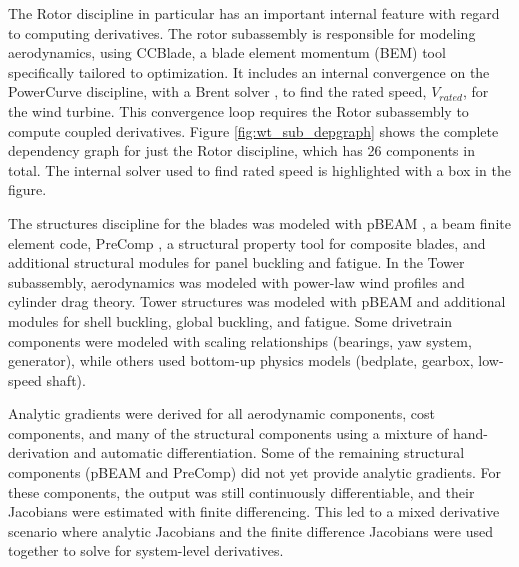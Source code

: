 \documentclass[]{aiaa-tc} %
\begin{document}
    The Rotor discipline in particular has an important internal feature with regard to computing derivatives.
    The rotor subassembly is responsible for modeling aerodynamics, using CCBlade\cite{NING:BEM},
    a blade element momentum (BEM) tool specifically tailored to optimization. It includes
    an internal convergence on the PowerCurve discipline, with a Brent solver \cite{Brent1971}, to find the
    rated speed, $V_{rated}$, for the wind turbine. This convergence loop requires the Rotor
    subassembly to compute coupled derivatives. Figure \ref{fig:wt_sub_depgraph} shows the complete
    dependency graph for just the Rotor discipline, which has 26 components in total.  The internal solver used to find rated speed is highlighted with a box in the figure.

    The structures discipline for the blades was modeled with pBEAM \cite{Ning2013b},
    a beam finite element code, PreComp \cite{Bir2005}, a structural property tool for
    composite blades, and additional structural modules for panel buckling and fatigue. In the Tower subassembly,
    aerodynamics was modeled with power-law wind profiles and cylinder drag theory.
    Tower structures was modeled with pBEAM and additional modules for shell buckling,
    global buckling, and fatigue.  Some drivetrain components were modeled with scaling
    relationships (bearings, yaw system, generator), while others used bottom-up physics
    models (bedplate, gearbox, low-speed shaft).

    Analytic gradients were derived for all aerodynamic components, cost components, and many of the structural components using a mixture of hand-derivation and automatic differentiation.  Some of the remaining structural components (pBEAM and PreComp) did not yet provide analytic gradients.  For these components, the output was still continuously differentiable, and their Jacobians were estimated with finite differencing.  This led to a mixed derivative scenario where analytic Jacobians and the finite difference Jacobians were used together to solve for system-level derivatives.



\end{document}
